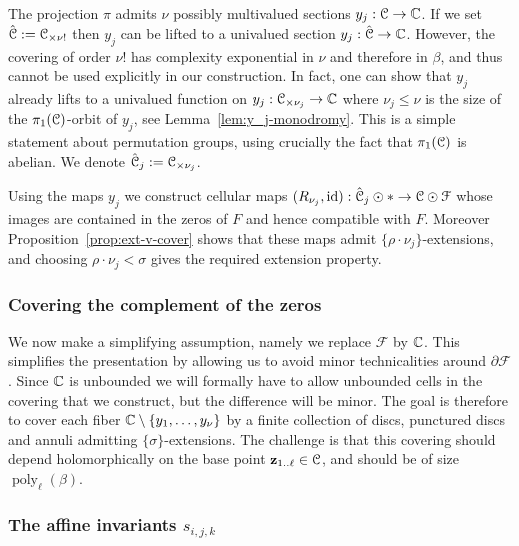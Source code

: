 \documentclass[reqno]{amsart}
\renewcommand\~[1]{\widetilde{#1}}
\def\poly{\operatorname{poly}} \def\J{\operatorname{J}}
\def\cF{{\mathcal F}} \def\cL{{\mathcal L}} \def\cR{{\mathcal R}}
\def\id{\operatorname{id}}
\def\vz{{\mathbf z}}
\def\he#1{{\{#1\}}}
\def\hsigma{{\he\sigma}}
\begin{document}
The projection $\pi$ admits $\nu$ possibly multivalued sections
$y_j:{\mathcal C}\to{\mathbb C}$. If we set $\hat{{\mathcal C}}:={\mathcal C}_{\times\nu!}$ then $y_j$ can
be lifted to a univalued section $y_j:\hat{{\mathcal C}}\to{\mathbb C}$. However, the
covering of order $\nu!$ has complexity exponential in $\nu$ and
therefore in $\beta$, and thus cannot be used explicitly in our
construction.  In fact, one can show that $y_j$ already lifts to a
univalued function on $y_j:{\mathcal C}_{\times\nu_j}\to{\mathbb C}$ where $\nu_j\le\nu$
is the size of the $\pi_1({\mathcal C})$-orbit of $y_j$, see
Lemma~\ref{lem:y_j-monodromy}. This is a simple statement about
permutation groups, using crucially the fact that $\pi_1({\mathcal C})$ is
abelian. We denote $\hat{{\mathcal C}}_j:={\mathcal C}_{\times\nu_j}$.

Using the maps $y_j$ we construct cellular maps
$(R_{\nu_j},\id):\hat\cC_j\odot*\to\cC\odot\cF$ whose images are
contained in the zeros of $F$ and hence compatible with $F$. Moreover
Proposition~\ref{prop:ext-v-cover} shows that these maps admit
$\he{\rho\cdot\nu_j}$-extensions, and choosing
$\rho\cdot\nu_j<\sigma$ gives the required extension property.

\subsubsection{Covering the complement of the zeros}

We now make a simplifying assumption, namely we replace $\cF$ by
${\mathbb C}$. This simplifies the presentation by allowing us to avoid minor
technicalities around $\partial\cF$. Since ${\mathbb C}$ is unbounded we will
formally have to allow unbounded cells in the covering that we
construct, but the difference will be minor. The goal is therefore to
cover each fiber ${\mathbb C}\setminus\{y_1,\ldots,y_\nu\}$ by a finite
collection of discs, punctured discs and annuli admitting
$\hsigma$-extensions. The challenge is that this covering should
depend holomorphically on the base point $\vz_{1..\ell}\in\cC$, and
should be of size $\poly_\ell(\beta)$.

\subsubsection{The affine invariants $s_{i,j,k}$}
\end{document}
